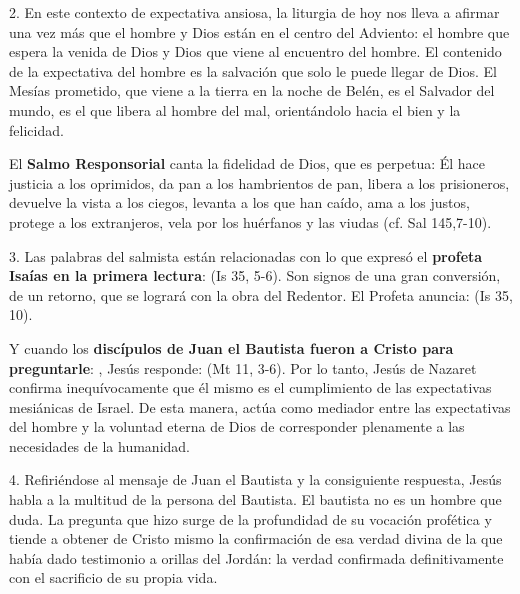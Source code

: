 2. En este contexto de expectativa ansiosa, la liturgia de hoy nos lleva a afirmar una vez más que el hombre y Dios están en el centro del Adviento: el hombre que espera la venida de Dios y Dios que viene al encuentro del hombre. El contenido de la expectativa del hombre es la salvación que solo le puede llegar de Dios. El Mesías prometido, que viene a la tierra en la noche de Belén, es el Salvador del mundo, es el que libera al hombre del mal, orientándolo hacia el bien y la felicidad.

El \textbf{Salmo Responsorial} canta la fidelidad de Dios, que es perpetua: Él hace justicia a los oprimidos, da pan a los hambrientos de pan, libera a los prisioneros, devuelve la vista a los ciegos, levanta a los que han caído, ama a los justos, protege a los extranjeros, vela por los huérfanos y las viudas (cf. Sal 145,7-10).

3. Las palabras del salmista están relacionadas con lo que expresó el \textbf{profeta Isaías en la primera lectura}:  (Is 35, 5-6). Son signos de una gran conversión, de un retorno, que se logrará con la obra del Redentor. El Profeta anuncia:  (Is 35, 10).

Y cuando los \textbf{discípulos de Juan el Bautista fueron a Cristo para preguntarle}: , Jesús responde:  (Mt 11, 3-6). Por lo tanto, Jesús de Nazaret confirma inequívocamente que él mismo es el cumplimiento de las expectativas mesiánicas de Israel. De esta manera, actúa como mediador entre las expectativas del hombre y la voluntad eterna de Dios de corresponder plenamente a las necesidades de la humanidad.

4. Refiriéndose al mensaje de Juan el Bautista y la consiguiente respuesta, Jesús habla a la multitud de la persona del Bautista. El bautista no es un hombre que duda. La pregunta que hizo surge de la profundidad de su vocación profética y tiende a obtener de Cristo mismo la confirmación de esa verdad divina de la que había dado testimonio a orillas del Jordán: la verdad confirmada definitivamente con el sacrificio de su propia vida.

